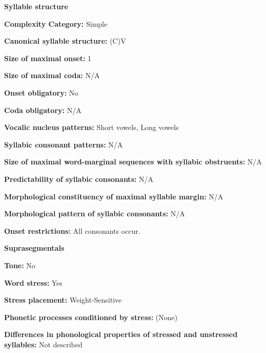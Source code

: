\textbf{Syllable structure}



\textbf{Complexity Category:} Simple



\textbf{Canonical syllable structure:} (C)V \citep[28-9]{Robinson2011}



\textbf{Size of maximal onset:} 1



\textbf{Size of maximal coda:} N/A



\textbf{Onset obligatory:} No



\textbf{Coda obligatory:} N/A



\textbf{Vocalic nucleus patterns:} Short vowels, Long vowels



\textbf{Syllabic consonant patterns:} N/A



\textbf{Size of maximal word{}-marginal sequences with syllabic obstruents:} N/A



\textbf{Predictability of syllabic consonants:} N/A



\textbf{Morphological constituency of maximal syllable margin:} N/A



\textbf{Morphological pattern of syllabic consonants:} N/A



\textbf{Onset restrictions:} All consonants occur.



\textbf{Suprasegmentals}



\textbf{Tone:} No



\textbf{Word stress:} Yes



\textbf{Stress placement:} Weight-Sensitive



\textbf{Phonetic processes conditioned by stress:} (None)



\textbf{Differences in phonological properties of stressed and unstressed syllables:} Not described



